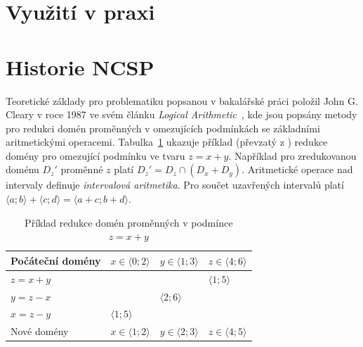 \section{Využití v praxi}

\section{Historie NCSP}
Teoretické základy pro problematiku popsanou v bakalářské práci položil John G. Cleary v roce 1987 ve svém článku \emph{Logical Arithmetic}~\cite{cleary87}, kde jsou popsány metody pro redukci domén proměnných v omezujících podmínkách se základními aritmetickými operacemi. Tabulka~\ref{narrowingTable} ukazuje příklad (převzatý z \cite{cleary87}) redukce domény pro omezující podmínku ve tvaru $z = x + y$. Například pro zredukovanou doménu $D_z'$ proměnné $z$ platí $D_z' = D_z \cap (D_x + D_y)$. Aritmetické operace nad intervaly definuje \emph{intervalová aritmetika}. Pro součet uzavřených intervalů platí $\langle a;b \rangle + \langle c;d \rangle = \langle a + c ; b + d \rangle$.

\begin{table}
\centering
\label{narrowingTable}
\begin{tabular}{|l|l|l|l|}
\hline
 Počáteční domény & $x \in \langle 0;2 \rangle$ & $y \in \langle 1;3 \rangle$ & $z \in \langle 4;6 \rangle$  \\ \hline
 $z = x+y$  &  & &  $\langle 1;5 \rangle$  \\ \hline
 $y = z-x$  & & $\langle 2;6 \rangle$  &  \\ \hline
 $x = z-y$  & $\langle 1;5 \rangle$  &  &  \\ \hline
 Nové domény & $x \in \langle 1;2 \rangle$ & $y \in \langle 2;3 \rangle$ & $z \in \langle 4;5 \rangle$ \\ \hline
\end{tabular}
\caption{Příklad redukce domén proměnných v podmínce $z = x + y$}
\end{table}